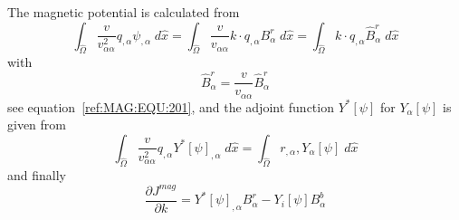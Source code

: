 The magnetic potential is calculated from 
\begin{equation}\label{ref:MAG:EQU:302}
\int_{\widehat{\Omega}} \frac{v}{v_{\alpha \alpha}^2} q_{,\alpha} \psi_{,\alpha} \;  d\widehat{x}  
=  \int_{\widehat{\Omega}}  \frac{v}{v_{\alpha \alpha}} k \cdot q_{,\alpha}  B^r_{\alpha} \; d\widehat{x}   
=  \int_{\widehat{\Omega}}  k \cdot q_{,\alpha}  \widehat{B}^r_{\alpha} \; d\widehat{x}   
\end{equation} 
with 
\begin{equation}\label{ref:MAG:EQU:302b}
\widehat{B}^r_{\alpha}  = \frac{v}{v_{\alpha \alpha}} \widehat{B}^r_{\alpha}
\end{equation} 
see equation~\ref{ref:MAG:EQU:201}, and the adjoint function $Y^*[\psi]$ for $Y_{\alpha}[\psi]$ is given from
\begin{equation}\label{ref:MAG:EQU:303}
\int_{\widehat{\Omega}} \frac{v}{v_{\alpha \alpha}^2} q_{,\alpha} Y^*[\psi]_{,\alpha } \;d\widehat{x}  =
\int_{\widehat{\Omega}} r_{,{\alpha}} ,Y_{\alpha}[\psi]  \;d\widehat{x}
\end{equation} 
and finally 
\begin{equation}\label{ref:GRAV:EQU:201a}
\frac{\partial J^{mag}}{\partial k} = Y^*[\psi]_{,{\alpha}}  B^r_{\alpha} - Y_i[\psi] B^b_{\alpha}
\end{equation} 


